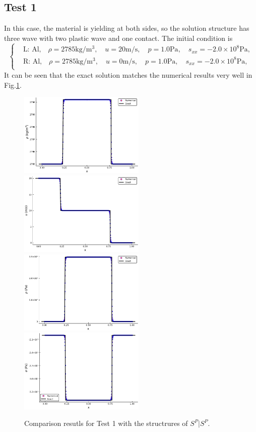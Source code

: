 \documentclass[review]{elsarticle}
\begin{document}
\subsection{Test 1}
In this case, the material is yielding at both sides, so the solution structure has three wave with two plastic wave and one contact.  
The initial condition is
\begin{equation}
 \left\{ \begin{aligned}
&	 \text{L: Al,}\quad  \rho = 2785 \text{kg}/\text{m}^3, \quad  u = 20\text{m}/\text{s}, \quad  p = 1.0\text{Pa}, \quad  s_{xx}=-2.0\times 10^8 \text{Pa},\\
&	 \text{R: Al,}\quad  \rho = 2785 \text{kg}/\text{m}^3, \quad  u = 0\text{m}/\text{s}, \quad  p = 1.0\text{Pa}, \quad  s_{xx}=-2.0\times 10^8 \text{Pa},\\
   \end{aligned}
 \right.
\end{equation}
It can be seen that the exact solution matches the numerical results very well in Fig.\ref{fig:case1}.
\begin{figure}
  \centering

  \includegraphics[width= 6cm] {case1rho.pdf}
  \includegraphics[width= 6cm] {case1u.pdf}
  \includegraphics[width= 6cm] {case1p.pdf}
  \includegraphics[width= 6cm] {case1sigma.pdf}

    \caption{Comparison resutls for Test 1 with the structrures of $S^P|S^P$.  }
  \label{fig:case1}
\end{figure}
\end{document}
